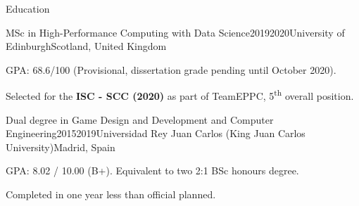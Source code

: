 \documentclass{resume} %
\begin{document}
\begin{mainSection}{Education}

\begin{educationItem}
{MSc in High-Performance Computing with Data Science}{2019}{2020}{University of Edinburgh}{Scotland, United Kingdom}

GPA: 68.6/100 (Provisional, dissertation grade pending until October 2020).

Selected for the \textbf{ISC - SCC (2020)} as part of TeamEPPC, 5\textsuperscript{th} overall position.%
\end{educationItem}

\begin{educationItem}
{Dual degree in Game Design and Development and Computer Engineering}{2015}{2019}{Universidad Rey Juan Carlos (King Juan Carlos University)}{Madrid, Spain}

GPA: 8.02 / 10.00 (B+). Equivalent to two 2:1 BSc honours degree.

Completed in one year less than official planned.
\end{educationItem}

\end{mainSection}




\end{document}
